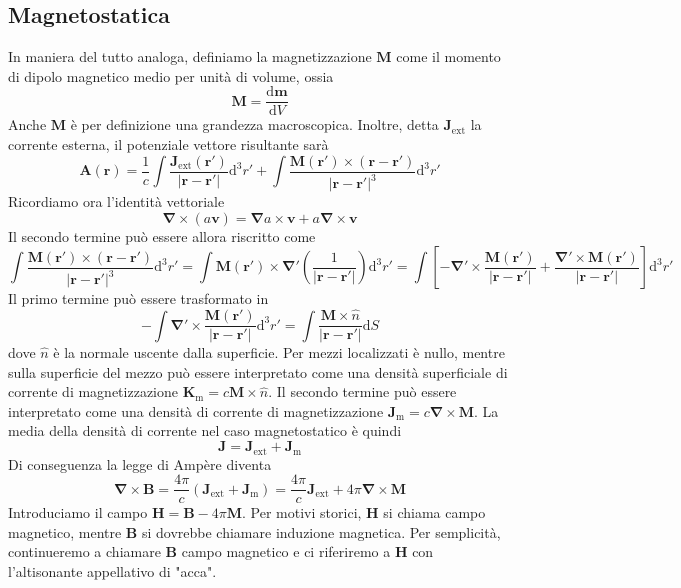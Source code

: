 \documentclass[a4paper,11pt]{book}
\renewcommand{\d}{\mathrm{d}}
\let\oldnabla\nabla
\renewcommand{\nabla}{\vec{\oldnabla}}
\renewcommand{\vec}[1]{\mathbf{#1}}
\theoremstyle{theorem}
\theoremstyle{definition}
\begin{document}
 \subsection{Magnetostatica}
 In maniera del tutto analoga, definiamo la magnetizzazione $\vec{M}$ come il momento di dipolo magnetico medio per unità di volume, ossia
 \[\vec{M}=\frac{\d \vec{m}}{\d V}\]
 Anche $\vec{M}$ è per definizione una grandezza macroscopica. Inoltre, detta $\vec{J}_\textrm{ext}$ la corrente esterna, il potenziale vettore risultante sarà
 \[\vec{A}(\vec{r})=\frac{1}{c}\int\frac{\vec{J}_\textrm{ext}(\vec{r}')}{|\vec{r}-\vec{r}'|}\d^3r'+\int\frac{\vec{M}(\vec{r}')\times(\vec{r}-\vec{r}')}{|\vec{r}-\vec{r}'|^3}\d^3r'\]
 Ricordiamo ora l'identità vettoriale
 \[\nabla\times(a\vec{v})=\nabla a\times\vec{v}+a\nabla\times\vec{v}\]
 Il secondo termine può essere allora riscritto come
 \[\int\frac{\vec{M}(\vec{r}')\times(\vec{r}-\vec{r}')}{|\vec{r}-\vec{r}'|^3}\d^3r'=\int\vec{M}(\vec{r}')\times\nabla'\left(\frac{1}{|\vec{r}-\vec{r}'|}\right)\d^3r'=\int\left[-\nabla'\times\frac{\vec{M}(\vec{r}')}{|\vec{r}-\vec{r}'|}+\frac{\nabla'\times\vec{M}(\vec{r}')}{|\vec{r}-\vec{r}'|}\right]\d^3r'\]
 Il primo termine può essere trasformato in
 \[-\int\nabla'\times\frac{\vec{M}(\vec{r}')}{|\vec{r}-\vec{r}'|}\d^3r'=\int\frac{\vec{M}\times\hat{n}}{|\vec{r}-\vec{r}'|}\d S\]
 dove $\hat{n}$ è la normale uscente dalla superficie. Per mezzi localizzati è nullo, mentre sulla superficie del mezzo può essere interpretato come una densità superficiale di corrente di magnetizzazione $\vec{K}_\textrm{m}=c\vec{M}\times\hat{n}$. Il secondo termine può essere interpretato come una densità di corrente di magnetizzazione $\vec{J}_\textrm{m}=c\nabla\times\vec{M}$. La media della densità di corrente nel caso magnetostatico è quindi
 \[\vec{J}=\vec{J}_\textrm{ext}+\vec{J}_\textrm{m}\]
 Di conseguenza la legge di Ampère diventa
 \[\nabla\times\vec{B}=\frac{4\pi}{c}(\vec{J}_\textrm{ext}+\vec{J}_\textrm{m})=\frac{4\pi}{c}\vec{J}_\textrm{ext}+4\pi\nabla\times\vec{M}\]
 Introduciamo il campo $\vec{H}=\vec{B}-4\pi\vec{M}$. Per motivi storici, $\vec{H}$ si chiama campo magnetico, mentre $\vec{B}$ si dovrebbe chiamare induzione magnetica. Per semplicità, continueremo a chiamare $\vec{B}$ campo magnetico e ci riferiremo a $\vec{H}$ con l'altisonante appellativo di "acca".
\end{document}
